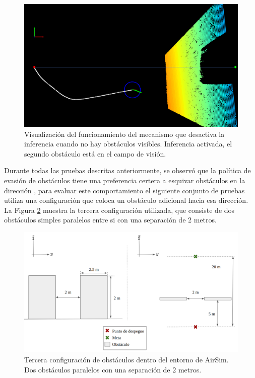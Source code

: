 \begin{figure}[H]
    \centering
    \includegraphics[scale=0.225]{partes/img/depth-dual-panel-3-second-obs.png}
    \caption[Visualización del funcionamiento del mecanismo que desactiva la inferencia cuando no hay obstáculos visibles. Inferencia activada, el segundo obstáculo está en el campo de visión.]{Visualización del funcionamiento del mecanismo que desactiva la inferencia cuando no hay obstáculos visibles. Inferencia activada, el segundo obstáculo está en el campo de visión.}
    \label{fig:depth-dual-panel-3}
\end{figure}

Durante todas las pruebas descritas anteriormente, se observó que la política de evasión de obstáculos tiene una preferencia certera a esquivar obstáculos en la dirección , para evaluar este comportamiento el siguiente conjunto de pruebas utiliza una configuración que coloca un obstáculo adicional hacia esa dirección. La Figura \ref{fig:config-3-parallel} muestra la tercera configuración utilizada, que consiste de dos obstáculos simples paralelos entre si con una separación de 2 metros.

\begin{figure}[H]
    \centering
    \includegraphics[scale=0.35]{partes/img/config-3-parallel.png}
    \caption[Tercera configuración de obstáculos dentro del entorno de AirSim.]{Tercera configuración de obstáculos dentro del entorno de AirSim. Dos obstáculos paralelos con una separación de 2 metros.}
    \label{fig:config-3-parallel}
\end{figure}

